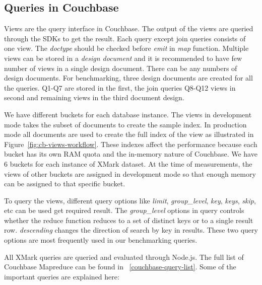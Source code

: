 \subsection{Queries in Couchbase}
Views are the query interface in Couchbase. The output of the views are queried through the SDKs to get the result. Each query except join queries consists of one view. The \textit{doctype} should be checked before \textit{emit} in \textit{map} function. Multiple views can be stored in a \textit{design document} and it is recommended to have few number of views in a single design document. There can be any numbers of design documents. For benchmarking, three design documents are created for all the queries. Q1-Q7 are stored in the first, the join queries Q8-Q12 views in second and remaining views in the third document design. 
\par
We have different buckets for each database instance. The views in development mode takes the subset of documents to create the sample index. In production mode all documents are used to create the full index of the view  as illustrated in Figure~\ref{fig:cb-views-workflow}. These indexes affect the performance because each bucket has its own RAM quota and the in-memory nature of Couchbase. We have 6 buckets for each instance of XMark dataset. At the time of measurements, the views of other buckets are assigned in development mode so that enough memory can be assigned to that specific bucket. 
\par 
To query the views, different query options like \textit{limit}, \textit{group\_level}, \textit{key}, \textit{keys}, \textit{skip}, etc can be used get required result. The \textit{group\_level} options in query controls whether the reduce function reduces to a set of distinct keys or to a single result row.  \textit{descending} changes the direction of search by key in results. These two query options are most frequently used in our benchmarking queries.
\par
All XMark queries  are queried and evaluated through Node.js. The full list of Couchbase Mapreduce can be found in ~\ref{couchbase-query-list}. Some of the important queries are explained here:


